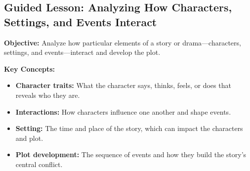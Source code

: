\documentclass[12pt]{article}
\title{}
\date{}
\begin{document}
\subsection*{Guided Lesson: Analyzing How Characters, Settings, and Events Interact}
\onehalfspacing

\begin{tcolorbox}[colframe=black!40, colback=gray!5, 
coltitle=black, colbacktitle=black!20, fonttitle=\bfseries\Large, 
title=Learning Objective, halign title=center, left=5pt, right=5pt, top=5pt, bottom=15pt]
\textbf{Objective:} Analyze how particular elements of a story or drama—characters, settings, and events—interact and develop the plot.
\end{tcolorbox}

\vspace{1em}

\begin{tcolorbox}[colframe=black!60, colback=white, 
coltitle=black, colbacktitle=black!15, fonttitle=\bfseries\Large, 
title=Key Concepts and Vocabulary, halign title=center, left=10pt, right=10pt, top=10pt, bottom=15pt]
\textbf{Key Concepts:}
\begin{itemize}
    \item \textbf{Character traits:} What the character says, thinks, feels, or does that reveals who they are.
    \item \textbf{Interactions:} How characters influence one another and shape events.
    \item \textbf{Setting:} The time and place of the story, which can impact the characters and plot.
    \item \textbf{Plot development:} The sequence of events and how they build the story's central conflict.
\end{itemize}
\end{tcolorbox}

\vspace{1em}
\end{document}
